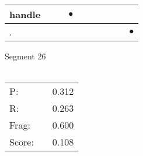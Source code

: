 \documentclass[landscape]{article}
\newcommand{\ssp}{\hspace{2pt}}
\newcommand{\mex}{\cellcolor{g}$\bullet$}
\begin{document}
\begin{tabular}{|l|p{10pt}|p{10pt}|p{10pt}|p{10pt}|p{10pt}|p{10pt}|p{10pt}|p{10pt}|p{10pt}|}
\hline
\ssp \cellcolor{ref2}handle \ssp&\hspace{2pt}&\hspace{2pt}&\hspace{2pt}\mex&\hspace{2pt}&\hspace{2pt}&\hspace{2pt}&\hspace{2pt}&\hspace{2pt}&\hspace{2pt}\\
\hline
\ssp \cellcolor{ref8}. \ssp&\hspace{2pt}&\hspace{2pt}&\hspace{2pt}&\hspace{2pt}&\hspace{2pt}&\hspace{2pt}&\hspace{2pt}&\hspace{2pt}&\hspace{2pt}\mex\\
\hline
\end{tabular}

\vspace{6pt}
\noindent Segment 26\\\\
\noindent\begin{tabular}{lm{12pt}r}
\hline
P:&&0.312\\
R:&&0.263\\
Frag:&&0.600\\
Score:&&0.108\\
\end{tabular}

\newpage
\end{document}
